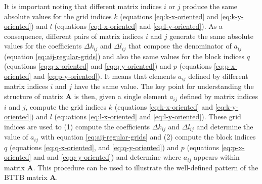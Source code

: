 \documentclass[manuscript,revised]{geophysics}
\begin{document}
It is important noting that different matrix indices $i$ or $j$ produce the same 
absolute values for the grid indices $k$ (equations \ref{eq:k-x-oriented} and
\ref{eq:k-y-oriented}) and $l$ (equations \ref{eq:l-x-oriented} and
\ref{eq:l-y-oriented}). As a consequence, different pairs of matrix indices $i$
and $j$ generate the same absolute values for the coefficients $\Delta k_{ij}$ and
$\Delta l_{ij}$ that compose the denominator of $a_{ij}$ 
(equation \ref{eq:aij-regular-grids}) and also the same values for the block indices
$q$ (equations \ref{eq:q-x-oriented} and \ref{eq:q-y-oriented}) and 
$p$ (equations \ref{eq:p-x-oriented} and \ref{eq:p-y-oriented}). 
It means that elements $a_{ij}$ defined
by different matrix indices $i$ and $j$ have the same value. The key point for
understanding the structure of matrix $\mathbf{A}$ is then, given a single element $a_{ij}$
defined by matrix indices $i$ and $j$, compute the grid indices 
$k$ (equations \ref{eq:k-x-oriented} and \ref{eq:k-y-oriented}) and
$l$ (equations \ref{eq:l-x-oriented} and \ref{eq:l-y-oriented}).
These grid indices are used to 
(1) compute the coefficients $\Delta k_{ij}$ and 
$\Delta l_{ij}$ and determine the value of $a_{ij}$ with equation 
\ref{eq:aij-regular-grids} and 
(2) compute the block indices $q$ (equations \ref{eq:q-x-oriented}, 
and \ref{eq:q-y-oriented}) and $p$ (equations \ref{eq:p-x-oriented} and
and \ref{eq:p-y-oriented}) and determine where $a_{ij}$ appears
within matrix $\mathbf{A}$. This procedure can be used to illustrate the 
well-defined pattern of the BTTB matrix $\mathbf{A}$.
\end{document}
